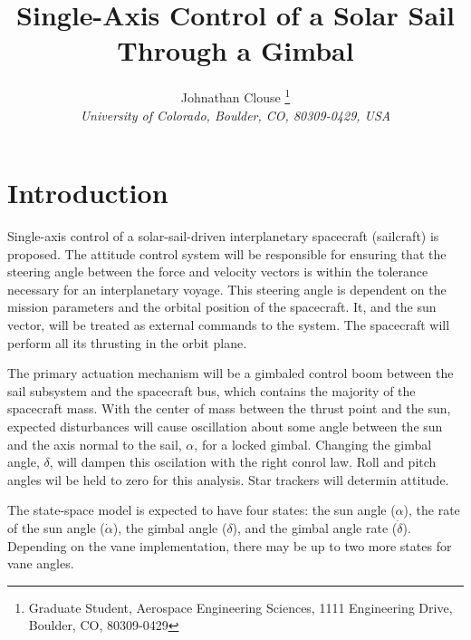 \documentclass[]{aiaa-tc}%
\title{Single-Axis Control of a Solar Sail Through a Gimbal}
\author{
	Johnathan Clouse%
	\thanks{Graduate Student, Aerospace Engineering Sciences, 1111 Engineering Drive, Boulder, CO, 80309-0429}\\
	{\normalsize\itshape
		University of Colorado, Boulder, CO, 80309-0429, USA}
}
\begin{document}
	

	
	\maketitle
	
	\begin{abstract}
		\noindent 
		
	\end{abstract}
	
	\newpage
	
	\tableofcontents
	
	\newpage

	\section{Introduction}
Single-axis control of a solar-sail-driven interplanetary spacecraft (sailcraft) is proposed.  The attitude control system will be responsible for ensuring that the steering angle between the force and velocity vectors is within the tolerance necessary for an interplanetary voyage.  This steering angle is dependent on the mission parameters and the orbital position of the spacecraft. It, and the sun vector, will be treated as external commands to the system. The spacecraft will perform all its thrusting in the orbit plane.
	
	\vspace{5 mm}
	
The primary actuation mechanism will be a gimbaled control boom between the sail subsystem and the spacecraft bus, which contains the majority of the spacecraft mass.  With the center of mass between the thrust point and the sun, expected disturbances will cause oscillation about some angle between the sun and the axis normal to the sail, $\alpha$, for a locked gimbal.  Changing the gimbal angle, $\delta$, will dampen this oscilation with the right conrol law. Roll and pitch angles wil be held to zero for this analysis. Star trackers will determin attitude.
	
	\vspace{5 mm}

The state-space model is expected to have four states: the sun angle ($\alpha$), the rate of the sun angle ($\dot{\alpha}$), the gimbal angle ($\delta$), and the gimbal angle rate ($\dot{\delta}$).  Depending on the vane implementation, there may be up to two more states for vane angles.
	
	\vspace{5 mm}
\end{document}

